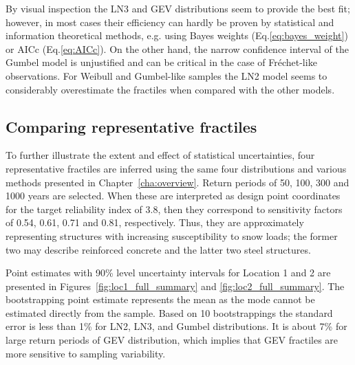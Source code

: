 By visual inspection the LN3 and GEV distributions seem to provide the best fit; however, in most cases their efficiency can hardly be proven by statistical and information theoretical methods, e.g. using Bayes weights (Eq.\ref{eq:bayes_weight}) or AICc (Eq.\ref{eq:AICc}). On the other hand, the narrow confidence interval of the Gumbel model is unjustified and can be critical in the case of Fréchet-like observations. For Weibull and Gumbel-like samples the LN2 model seems to considerably overestimate the fractiles when compared with the other models.

\subsection{Comparing representative fractiles}
To further illustrate the extent and effect of statistical uncertainties, four representative fractiles are inferred using the same four distributions and various methods presented in Chapter~\ref{cha:overview}. Return periods of 50, 100, 300 and 1000 years are selected. When these are interpreted as design point coordinates for the target reliability index of 3.8, then they correspond to sensitivity factors of 0.54, 0.61, 0.71 and 0.81, respectively. Thus, they are approximately representing structures with increasing susceptibility to snow loads; the former two may describe reinforced concrete and the latter two steel structures.

Point estimates with 90\% level uncertainty intervals for Location 1 and 2 are presented in Figures~\ref{fig:loc1_full_summary} and \ref{fig:loc2_full_summary}. The bootstrapping point estimate represents the mean as the mode cannot be estimated directly from the sample. Based on 10 bootstrappings the standard error is less than 1\% for LN2, LN3, and Gumbel distributions. It is about 7\% for large return periods of GEV distribution, which implies that GEV fractiles are more sensitive to sampling variability.

